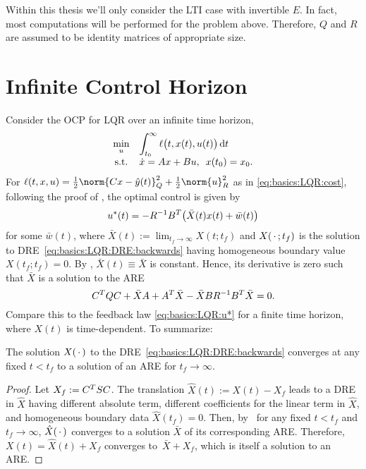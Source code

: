 Within this thesis we'll only consider the \ac{LTI} case with invertible $E$.
In fact, most computations will be performed for the problem above.
Therefore, $Q$ and $R$ are assumed to be identity matrices of appropriate size.

\section{Infinite Control Horizon}

Consider the \ac{OCP} for \ac{LQR} over an infinite time horizon,
\begin{equation}
\label{eq:basics:OCP'}
  \everymath{\displaystyle}
  \begin{array}{cl}
    \min_u & \int_{t_0}^{\infty} \ell\big(t, x(t), u(t)\big) \dt \\
    \text{s.t.} & \dot{x} = Ax + Bu, \enspace x(t_0) = x_0
    .
  \end{array}
\end{equation}
For
$
  \ell(t, x, u) = \onehalf \norm{Cx - \hat y(t)}_Q^2 + \onehalf \norm{u}_R^2
$
as in \eqref{eq:basics:LQR:cost},
following the proof of \cite[Theorem~3.2]{Locatelli2011},
the optimal control is given by
\begin{equation}
  u^*(t) = - R^{-1} B^T \big( \bar X(t) x(t) + \bar w(t) \big)
\end{equation}
for some $\bar w(t)$,
where $\bar X(t) := \lim_{t_f \to\infty} X(t; t_f)$
and $X(\optional{};t_f)$ is the solution to \ac{DRE}~\eqref{eq:basics:LQR:DRE:backwards}
having homogeneous boundary value $X(t_f; t_f) = 0$. %
By \cite[Theorem~3.3]{Locatelli2011},
$\bar X(t) \equiv \bar X$ is constant.
Hence, its derivative is zero such that $\bar X$ is a solution to the \ac{ARE}
\begin{equation}
\label{eq:basics:LQR:ARE}
  C^T Q C + \bar X A + A^T \bar X - \bar X B R^{-1} B^T \bar X = 0
  .
\end{equation}
Compare this to the feedback law \eqref{eq:basics:LQR:u*} for a finite time horizon,
where $X(t)$ is time-dependent.
To summarize:

\begin{proposition}
\label{thm:basics:dre-limit-are:backwards}
  The solution $X(\optional{})$ to the \ac{DRE}~\eqref{eq:basics:LQR:DRE:backwards}
  converges at any fixed $t<t_f$ to a solution of an \ac{ARE} for $t_f \to\infty$.
\end{proposition}
\begin{proof}
  Let $X_f := C^T S C$.
  The translation $\hat X(t) := X(t) - X_f$ leads to a \ac{DRE} in $\hat X$
  having different absolute term,
  different coefficients for the linear term in $\hat X$,
  and homogeneous boundary data $\hat X(t_f) = 0$.
  Then, by~\cite[Theorem~3.3]{Locatelli2011} for any fixed $t<t_f$ and $t_f\to\infty$,
  $\hat X(\optional{})$ converges to a solution $\bar X$ of its corresponding \ac{ARE}.
  Therefore, \mbox{$X(t) = \hat X(t) + X_f$} converges to~\mbox{$\bar X + X_f$},
  which is itself a solution to an \ac{ARE}.
\end{proof}

